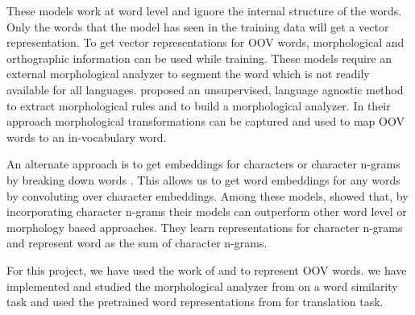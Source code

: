 These models work at word level and ignore the internal structure of the words. Only the words that the model has seen in the training data will get a vector representation. To get vector representations for OOV words,  morphological and orthographic information can be used \citep{botha2014compositional,luong2013better,bhatia2016morphological} while training. These models require an external morphological analyzer to segment the word which is not readily available for all languages. \cite{soricut2015unsupervised} proposed an unsupervised, language agnostic method to extract morphological rules and to build a morphological analyzer. In their approach morphological transformations can be captured and used to map OOV words to an in-vocabulary word.


An alternate approach is to get embeddings for characters or character n-grams by breaking down words \citep{bojanowski2016enriching,kim2016character,wieting2016charagram}.  This allows us to get word embeddings for any words by convoluting over character embeddings. Among these models, \citeauthor{bojanowski2016enriching} showed that, by incorporating character n-grams their models can outperform other word level or morphology based approaches. They learn representations for character n-grams and represent word as the sum of character n-grams. 


For this project, we have used the work of \cite{soricut2015unsupervised} and \cite{bojanowski2016enriching} to represent OOV words. we have implemented and studied the morphological analyzer from \cite{soricut2015unsupervised} on a word similarity task and used the pretrained word representations from \cite{bojanowski2016enriching} for translation task. 


